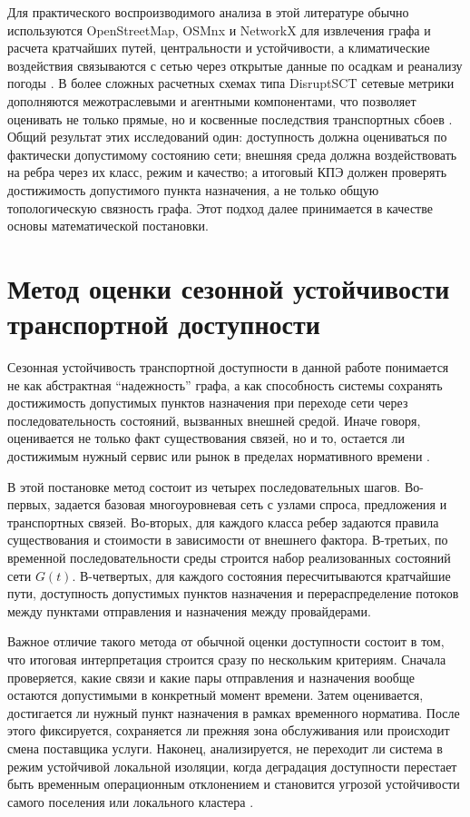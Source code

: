 Для практического воспроизводимого анализа в этой литературе обычно
используются OpenStreetMap, OSMnx и NetworkX для извлечения графа и расчета
кратчайших путей, центральности и устойчивости, а климатические воздействия
связываются с сетью через открытые данные по осадкам и реанализу погоды
\cite{boeing2017osmnx,hagberg2008networkx,funk2015chirps,hersbach2020era5,
osmContributors}. В более сложных расчетных схемах типа DisruptSCT сетевые метрики
дополняются межотраслевыми и агентными компонентами, что позволяет оценивать
не только прямые, но и косвенные последствия транспортных сбоев
\cite{colon2019tanzaniaSupplyChain}. Общий результат этих исследований один:
доступность должна оцениваться по фактически допустимому состоянию сети;
внешняя среда должна воздействовать на ребра через их класс, режим и
качество; а итоговый КПЭ должен проверять достижимость допустимого
пункта назначения, а не только общую топологическую связность графа. Этот подход
далее принимается в качестве основы математической постановки.



\section{Метод оценки сезонной устойчивости транспортной доступности}
\label{sec:seasonal-resilience-method}

Сезонная устойчивость транспортной доступности в данной работе понимается не
как абстрактная ``надежность'' графа, а как способность системы сохранять
достижимость допустимых пунктов назначения при переходе сети через
последовательность состояний, вызванных внешней средой. Иначе говоря,
оценивается не только факт существования связей, но и то, остается ли
достижимым нужный сервис или рынок в пределах нормативного времени
\cite{gangwal2023criticalFacility,
yin2023transportResilience}.

В этой постановке метод состоит из четырех последовательных шагов.
Во-первых, задается базовая многоуровневая сеть с узлами спроса,
предложения и транспортных связей. Во-вторых, для каждого класса ребер
задаются правила существования и стоимости в зависимости от внешнего
фактора. В-третьих, по временной последовательности среды строится набор
реализованных состояний сети \(G(t)\). В-четвертых, для каждого состояния
пересчитываются кратчайшие пути, доступность допустимых пунктов назначения и
перераспределение потоков между пунктами отправления и назначения между провайдерами.

Важное отличие такого метода от обычной оценки доступности состоит в том,
что итоговая интерпретация строится сразу по нескольким критериям. Сначала
проверяется, какие связи и какие пары отправления и назначения вообще остаются допустимыми в
конкретный момент времени. Затем оценивается, достигается ли нужный
пункт назначения в рамках временного норматива. После этого фиксируется,
сохраняется ли прежняя зона обслуживания или происходит смена поставщика
услуги. Наконец, анализируется, не переходит ли система в режим устойчивой
локальной изоляции, когда деградация доступности перестает быть временным
операционным отклонением и становится угрозой устойчивости самого
поселения или локального кластера
\cite{gangwal2023criticalFacility,yin2023transportResilience}.

